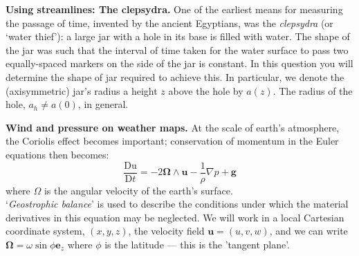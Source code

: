 \documentclass[answers]{exam}
\begin{document}
\begin{questions}
\question%
\textbf{Using streamlines: The clepsydra.} One of the earliest means for measuring the passage of time, invented by the ancient Egyptians, was the \emph{clepsydra} (or `water thief'): a large jar with a hole in its base is filled with water. The shape of the jar was such that the interval of time taken for the water surface to pass two equally-spaced markers on the side of the jar is constant. In this question you will determine the shape of jar required to achieve this. In particular, we denote the (axisymmetric) jar's radius a height $z$ above the hole by $a(z)$. The radius of the hole, $a_{h} \neq a(0)$, in general.



\question%
 \textbf{Wind and pressure on weather maps.} At the scale of earth's atmosphere, the Coriolis effect becomes important; conservation of momentum in the Euler equations then becomes: \[
	\frac{\mathrm{Du}}{\mathrm{D} t}=-2 \boldsymbol{\Omega} \wedge \mathbf{u}-\frac{1}{\rho} \nabla p+\mathbf{g}
\] where $\Omega$ is the angular velocity of the earth's surface.\\ `\emph{Geostrophic balance}' is used to describe the conditions under which the material derivatives in this equation may be neglected. We will work in a local Cartesian coordinate system, $(x, y, z)$, the velocity field $\mathbf{u}=(u, v, w)$, and we can write $\boldsymbol{\Omega}=\omega \sin \phi \mathbf{e}_{z}$ where $\phi$ is the latitude --- this is the 'tangent plane'.
\begin{parts}

\end{parts}
\end{questions}
\end{document}
